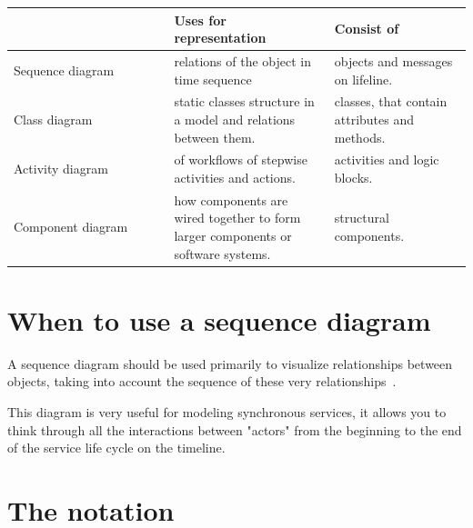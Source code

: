 \documentclass[10pt,slovak,a4paper]{article}
\begin{document}
 \begin{table}[htbp]
	\begin{tabular}{|p{0.35\linewidth}|p{0.35\linewidth}|p{0.35\linewidth}|}
	\hline
					  & Uses for representation                                                          & Consist of                                    \\ 
					  \hline
	Sequence diagram  & relations of the object in time sequence                                         & objects and messages on lifeline.             \\ 
	\hline
	Class diagram     & static classes structure in a model and relations between them.                  & classes, that contain attributes and methods. \\ 
	\hline
	Activity diagram  & of workflows of stepwise activities and actions.                                 & activities and logic blocks.                  \\ 
	\hline
	Component diagram & how components are wired together to form larger components or software systems. & structural components.                        \\ 
	\hline
	\end{tabular}
\end{table}

\section{When to use a sequence diagram} \label{when}
A sequence diagram should be used primarily to visualize relationships between objects, taking into account the sequence of these very relationships~\cite{IBM_SD}.

This diagram is very useful for modeling synchronous services, it allows you to think through all the interactions between "actors" from the beginning to the end of the service life cycle on the timeline.

\begin{figure}[tbh]
\centering
\end{figure}

\section{The notation} \label{notation}
\end{document}
